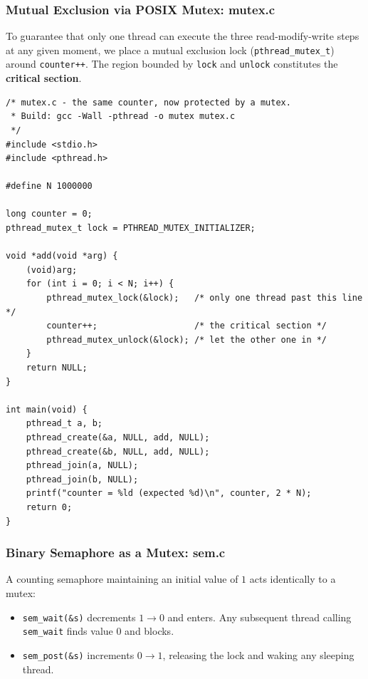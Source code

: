 \documentclass{labreport}
\begin{document}
\subsubsection{Mutual Exclusion via POSIX Mutex: mutex.c}
To guarantee that only one thread can execute the three read-modify-write steps at any given moment, we place a mutual exclusion lock (\texttt{pthread\_mutex\_t}) around \texttt{counter++}. The region bounded by \texttt{lock} and \texttt{unlock} constitutes the \textbf{critical section}.

\begin{lstlisting}[style=c]
/* mutex.c - the same counter, now protected by a mutex.
 * Build: gcc -Wall -pthread -o mutex mutex.c
 */
#include <stdio.h>
#include <pthread.h>

#define N 1000000

long counter = 0;
pthread_mutex_t lock = PTHREAD_MUTEX_INITIALIZER;

void *add(void *arg) {
    (void)arg;
    for (int i = 0; i < N; i++) {
        pthread_mutex_lock(&lock);   /* only one thread past this line */
        counter++;                   /* the critical section */
        pthread_mutex_unlock(&lock); /* let the other one in */
    }
    return NULL;
}

int main(void) {
    pthread_t a, b;
    pthread_create(&a, NULL, add, NULL);
    pthread_create(&b, NULL, add, NULL);
    pthread_join(a, NULL);
    pthread_join(b, NULL);
    printf("counter = %ld (expected %d)\n", counter, 2 * N);
    return 0;
}
\end{lstlisting}

\subsubsection{Binary Semaphore as a Mutex: sem.c}
A counting semaphore maintaining an initial value of $1$ acts identically to a mutex:
\begin{itemize}[noitemsep]
    \item \texttt{sem\_wait(\&s)} decrements $1 \to 0$ and enters. Any subsequent thread calling \texttt{sem\_wait} finds value $0$ and blocks.
    \item \texttt{sem\_post(\&s)} increments $0 \to 1$, releasing the lock and waking any sleeping thread.
\end{itemize}
\end{document}
